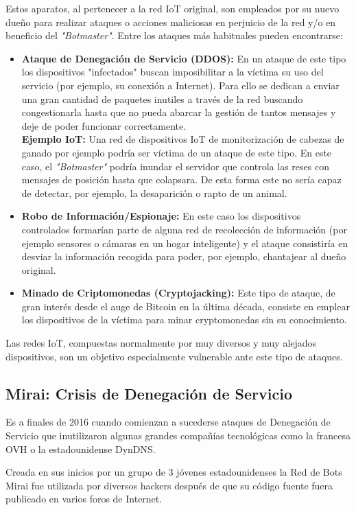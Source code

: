 Estos aparatos, al pertenecer a la red IoT original, son empleados por su nuevo dueño para realizar ataques o acciones maliciosas en perjuicio de la red y/o en beneficio del \textit{"Botmaster"}. Entre los ataques más habituales pueden encontrarse:
\begin{itemize}
	\item \textbf{Ataque de Denegación de Servicio (DDOS):} En un ataque de este tipo los dispositivos "infectados" buscan imposibilitar a la víctima su uso del servicio (por ejemplo, su conexión a Internet). Para ello se dedican a enviar una gran cantidad de paquetes inutiles a través de la red buscando congestionarla hasta que no pueda abarcar la gestión de tantos mensajes y deje de poder funcionar correctamente. \\
	\textbf{Ejemplo IoT:} Una red de dispositivos IoT de monitorización de cabezas de ganado por ejemplo podría ser víctima de un ataque de este tipo. En este caso, el \textit{"Botmaster"} podría inundar el servidor que controla las reses con mensajes de posición hasta que colapsara. De esta forma este no sería capaz de detectar, por ejemplo, la desaparición o rapto de un animal.
	\item \textbf{Robo de Información/Espionaje:} En este caso los dispositivos controlados formarían parte de alguna red de recolección de información (por ejemplo sensores o cámaras en un hogar inteligente) y el ataque consistiría en desviar la información recogida para poder, por ejemplo, chantajear al dueño original.
	\item \textbf{Minado de Criptomonedas (Cryptojacking):} Este tipo de ataque, de gran interés desde el auge de Bitcoin en la última década, consiste en emplear los dispositivos de la víctima para minar cryptomonedas sin su conocimiento. 
\end{itemize}
Las redes IoT, compuestas normalmente por muy diversos y muy alejados dispositivos, son un objetivo especialmente vulnerable ante este tipo de ataques.
\subsection{Mirai: Crisis de Denegación de Servicio}
Es a finales de 2016 cuando comienzan a sucederse ataques de Denegación de Servicio que inutilizaron algunas grandes compañías tecnológicas como la francesa OVH o la estadounidense DynDNS. 


 Creada en sus inicios por un grupo de 3 jóvenes estadounidenses la Red de Bots Mirai fue utilizada por diversos hackers después de que su código fuente fuera publicado en varios foros de Internet. 
 
